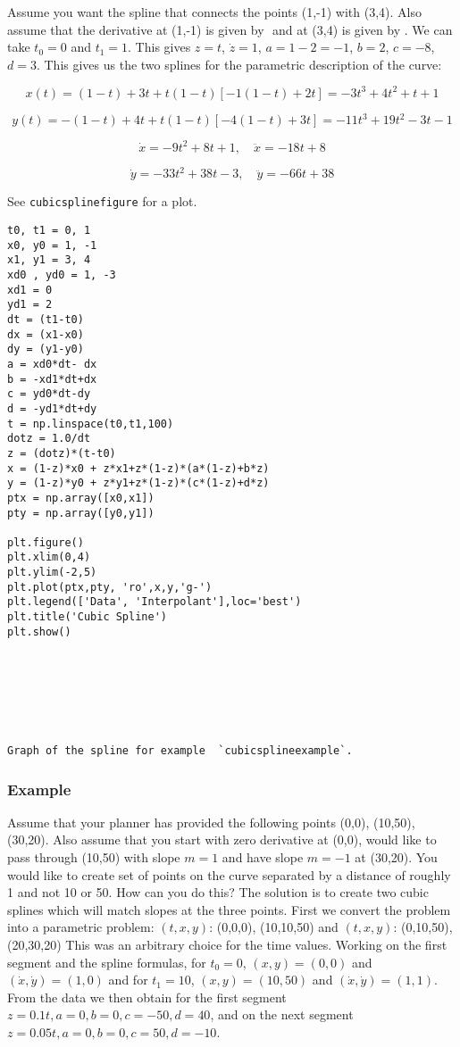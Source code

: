 Assume you want the spline that connects the points (1,-1) with (3,4).
Also assume that the derivative at (1,-1) is given by \(<1,-3>\) and at
(3,4) is given by \(<0,2>\). We can take \(t_0=0\) and \(t_1 = 1\). This
gives \(z = t\), \(\dot{z} = 1\), \(a = 1 - 2 = -1\), \(b = 2\),
\(c = -8\), \(d = 3\). This gives us the two splines for the parametric
description of the curve:

\[x(t) = (1-t) + 3t + t(1-t)[-1(1-t) + 2t]  = -3 t^3+4 t^2+t+1\]

\[y(t) = -(1-t) + 4t + t(1-t)[-4(1-t)+3t] =  -11 t^3+19 t^2-3 t-1\]

\[\dot{x} = -9t^2+8t+1, \quad \ddot{x} =   -18t+8\]

\[\dot{y} =   -33t^2 +38t -3, \quad \ddot{y} =  -66t+38\]

See \texttt{cubicsplinefigure} for a plot.

\begin{verbatim}
t0, t1 = 0, 1
x0, y0 = 1, -1
x1, y1 = 3, 4
xd0 , yd0 = 1, -3
xd1 = 0
yd1 = 2
dt = (t1-t0)
dx = (x1-x0)
dy = (y1-y0)
a = xd0*dt- dx
b = -xd1*dt+dx
c = yd0*dt-dy
d = -yd1*dt+dy
t = np.linspace(t0,t1,100)
dotz = 1.0/dt
z = (dotz)*(t-t0)
x = (1-z)*x0 + z*x1+z*(1-z)*(a*(1-z)+b*z)
y = (1-z)*y0 + z*y1+z*(1-z)*(c*(1-z)+d*z)
ptx = np.array([x0,x1])
pty = np.array([y0,y1])

plt.figure()
plt.xlim(0,4)
plt.ylim(-2,5)
plt.plot(ptx,pty, 'ro',x,y,'g-')
plt.legend(['Data', 'Interpolant'],loc='best')
plt.title('Cubic Spline')
plt.show()







Graph of the spline for example  `cubicsplineexample`.
\end{verbatim}

\hypertarget{example}{%
\subsubsection{Example}\label{example}}

Assume that your planner has provided the following points (0,0),
(10,50), (30,20). Also assume that you start with zero derivative at
(0,0), would like to pass through (10,50) with slope \(m=1\) and have
slope \(m=-1\) at (30,20). You would like to create set of points on the
curve separated by a distance of roughly 1 and not 10 or 50. How can you
do this? The solution is to create two cubic splines which will match
slopes at the three points. First we convert the problem into a
parametric problem: \((t,x,y)\): (0,0,0), (10,10,50) and \((t,x,y)\):
(0,10,50), (20,30,20) This was an arbitrary choice for the time values.
Working on the first segment and the spline formulas, for \(t_0 = 0\),
\((x,y) = (0,0)\) and \((\dot{x}, \dot{y} ) = (1,0)\) and for
\(t_1 = 10\), \((x,y) = (10,50)\) and \((\dot{x}, \dot{y} ) = (1,1)\).
From the data we then obtain for the first segment
\(z= 0.1t, a = 0, b = 0, c = -50, d = 40\), and on the next segment
\(z= 0.05t, a = 0, b = 0, c = 50, d = -10\).

